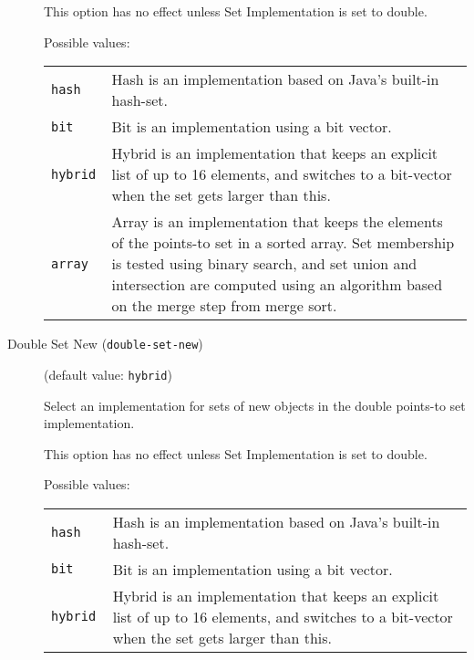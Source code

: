 \documentclass{article}
\begin{document}
\begin{description}
This option has no effect unless Set Implementation is set to double.
        



Possible values:\\
\begin{longtable}{p{1in}p{4in}}

{\tt hash }
&

Hash is an implementation based on Java's built-in hash-set.
\\

{\tt bit }
&

Bit is an implementation using a bit vector.
\\

{\tt hybrid }
&

Hybrid is an implementation that keeps an explicit list of up to
16 elements, and switches to a bit-vector when the set gets
larger than this.
\\

{\tt array }
&

Array is an implementation that keeps the elements of the
points-to set in a sorted array. Set membership is tested using
binary search, and set union and intersection are computed using
an algorithm based on the merge step from merge sort.
\\

\end{longtable}


\item[Double Set New ({\tt double-set-new})]
(default value: {\tt hybrid})




Select an implementation for sets of new objects in the double
points-to set implementation.

This option has no effect unless Set Implementation is set to double.
        



Possible values:\\
\begin{longtable}{p{1in}p{4in}}

{\tt hash }
&

Hash is an implementation based on Java's built-in hash-set.
\\

{\tt bit }
&

Bit is an implementation using a bit vector.
\\

{\tt hybrid }
&

Hybrid is an implementation that keeps an explicit list of up to
16 elements, and switches to a bit-vector when the set gets
larger than this.
\\


\end{longtable}
\end{description}
\end{document}
